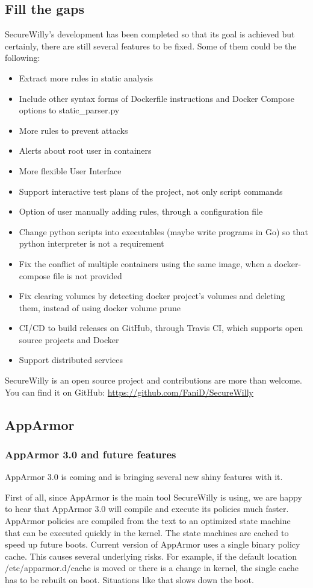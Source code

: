 \subsection{Fill the gaps}
SecureWilly's development has been completed so that its goal is achieved but certainly, there are still several features to be fixed. Some of them could be the following:
\begin{itemize}
\item Extract more rules in static analysis
\item Include other syntax forms of Dockerfile instructions and Docker Compose options to static\_parser.py
\item More rules to prevent attacks
\item Alerts about root user in containers
\item More flexible User Interface
\item Support interactive test plans of the project, not only script commands
\item Option of user manually adding rules, through a configuration file
\item Change python scripts into executables (maybe write programs in Go) so that python interpreter is not a requirement
\item Fix the conflict of multiple containers using the same image, when a docker-compose file is not provided
\item Fix clearing volumes by detecting docker project's volumes and deleting them, instead of using docker volume prune
\item CI/CD to build releases on GitHub, through Travis CI, which supports open source projects and Docker
\item Support distributed services
\end{itemize}
SecureWilly is an open source project and contributions are more than welcome. You can find it on GitHub: \url{https://github.com/FaniD/SecureWilly}

\subsection{AppArmor}
\subsubsection{AppArmor 3.0 and future features} \label{newappfeatures}
AppArmor 3.0 is coming and is bringing several new shiny features with it. \cite{app3seth}

First of all, since AppArmor is the main tool SecureWilly is using, we are happy to hear that AppArmor 3.0 will compile and execute its policies much faster. AppArmor policies are compiled from the text to an optimized state machine that can be executed quickly in the kernel. The state machines are cached to speed up future boots. Current version of AppArmor uses a single binary policy cache. This causes several underlying risks. For example, if the default location /etc/apparmor.d/cache is moved or there is a change in kernel, the single cache has to be rebuilt on boot. Situations like that slows down the boot.
  
